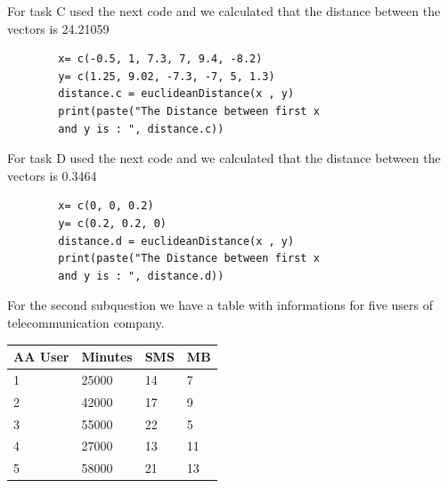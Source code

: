 \documentclass[10pt,a4paper]{article}
\begin{document}
	For task C used the next code and we calculated that the distance between the vectors is 24.21059
	\begin{lstlisting}
		x= c(-0.5, 1, 7.3, 7, 9.4, -8.2)
		y= c(1.25, 9.02, -7.3, -7, 5, 1.3)
		distance.c = euclideanDistance(x , y)
		print(paste("The Distance between first x 
		and y is : ", distance.c))
	\end{lstlisting}	
	For task D used the next code and we calculated that the distance between the vectors is 0.3464
	\begin{lstlisting}
		x= c(0, 0, 0.2)
		y= c(0.2, 0.2, 0)
		distance.d = euclideanDistance(x , y)
		print(paste("The Distance between first x
		and y is : ", distance.d))
	\end{lstlisting}	\newpage
	
	For the second subquestion we have a table with informations for five users of telecommunication company.
	\begin{table}[]
		\begin{tabular}{|l|l|l|l|} \hline
			AA User & Minutes & SMS & MB \\ \hline
			1       & 25000   & 14  & 7  \\ \hline
			2       & 42000   & 17  & 9  \\ \hline
			3       & 55000   & 22  & 5  \\ \hline
			4       & 27000   & 13  & 11 \\ \hline
			5       & 58000   & 21  & 13 \\ \hline
		\end{tabular}
	\end{table}
	
\end{document}
